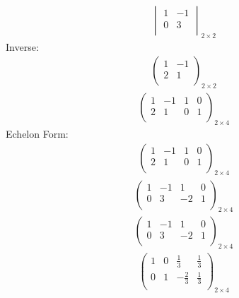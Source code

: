 \documentclass{article}
\begin{document}
\begin{align*}
\begin{vmatrix}
1 & -1\\
0 & 3\\
\end{vmatrix}_{2\times 2}
\end{align*}
Inverse:\\
\begin{align*}
\begin{pmatrix}
1 & -1\\
2 & 1\\
\end{pmatrix}_{2\times 2}
\end{align*}
\begin{align*}
\left(
\begin{array}{cc|cc}
1 & -1 & 1 & 0\\
2 & 1 & 0 & 1\\
\end{array}
\right)_{2\times 4}
\end{align*}
Echelon Form:\\
\begin{align*}
\left(
\begin{array}{cc|cc}
1 & -1 & 1 & 0\\
2 & 1 & 0 & 1\\
\end{array}
\right)_{2\times 4}
\end{align*}
\begin{align*}
\left(
\begin{array}{cc|cc}
1 & -1 & 1 & 0\\
0 & 3 & -2 & 1\\
\end{array}
\right)_{2\times 4}
\end{align*}
\begin{align*}
\left(
\begin{array}{cc|cc}
1 & -1 & 1 & 0\\
0 & 3 & -2 & 1\\
\end{array}
\right)_{2\times 4}
\end{align*}
\begin{align*}
\left(
\begin{array}{cc|cc}
1 & 0 & \frac{1}{3} & \frac{1}{3}\\
0 & 1 & -\frac{2}{3} & \frac{1}{3}\\
\end{array}
\right)_{2\times 4}
\end{align*}
\end{document}
